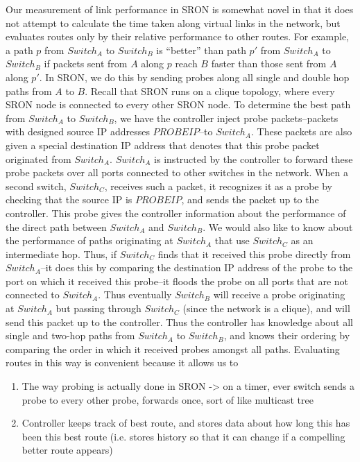 \documentclass[pageno]{jpaper}
\begin{document}
Our measurement of link performance in SRON is somewhat novel in that it does not attempt to calculate 
the time taken along virtual links in the network, but evaluates routes only by their relative performance 
to other routes. For example, a path $p$ from $Switch_A$ to $Switch_B$ is ``better'' than path $p'$ from 
$Switch_A$ to $Switch_B$ if packets sent from $A$ along $p$ reach $B$ faster than those sent from $A$ along
$p'$.  In SRON, we do this by sending probes along all single and double hop paths from $A$ to $B$.
Recall that SRON runs on a clique topology, where every SRON node is connected to every other SRON node.
To determine the best path from $Switch_A$ to $Switch_B$, we have the controller inject probe packets--packets with
designed source IP addresses $PROBEIP$--to $Switch_A$.  These packets are also given a special destination
IP address that denotes that this probe packet originated from $Switch_A$. $Switch_A$ is instructed by 
the controller to forward these probe packets over all ports connected to other switches in the network. 
When a second switch, $Switch_C$, receives such a packet, it recognizes it as a probe by checking that 
the source IP is $PROBEIP$, and sends the packet up to the controller. This probe gives the controller 
information about the performance of the direct path between $Switch_A$ and $Switch_B$. We would also 
like to know about the performance of paths originating at $Switch_A$ that use $Switch_C$ as an intermediate
hop. Thus, if $Switch_C$ finds that it received this probe directly from $Switch_A$--it does this by 
comparing the destination IP address of the probe to the port on which it received this probe--it 
floods the probe on all ports that are not connected to $Switch_A$. Thus eventually $Switch_B$ will
receive a probe originating at $Switch_A$ but passing through $Switch_C$ (since the network is a 
clique), and will send this packet up to the controller. Thus the controller has knowledge about all
single and two-hop paths from $Switch_A$ to $Switch_B$, and knows their ordering by comparing the 
order in which it received probes amongst all paths. Evaluating routes in this way is convenient 
because it allows us to 
\begin{enumerate}
\item
The way probing is actually done in SRON -> on a timer, ever switch sends a probe to every other probe,
forwards once, sort of like multicast tree
\item
Controller keeps track of best route, and stores data about how long this has been this best route (i.e.
stores history so that it can change if a compelling better route appears) 
\end{enumerate}
\end{document}
